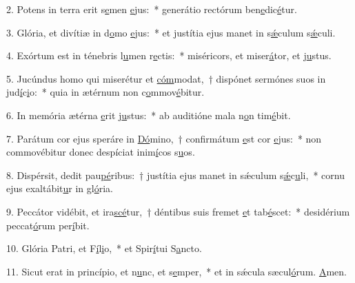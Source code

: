 2. Potens in terra erit s\uline{e}men \uline{e}jus:~* generátio rectórum ben\uline{e}dic\uline{é}tur.\par 
3. Glória, et divítiæ in d\uline{o}mo \uline{e}jus:~* et justítia ejus manet in s\uline{ǽ}culum s\uline{ǽ}culi.\par 
4. Exórtum est in ténebris l\uline{u}men r\uline{e}ctis:~* miséricors, et miser\uline{á}tor, et j\uline{u}stus.\par 
5. Jucúndus homo qui miserétur et \uline{cóm}modat,~† dispónet sermónes suos in jud\uline{í}c\uline{i}o:~* quia in ætérnum non c\uline{o}mmov\uline{é}bitur.\par 
6. In memória ætérna \uline{e}rit j\uline{u}stus:~* ab auditióne mala n\uline{o}n tim\uline{é}bit.\par 
7. Parátum cor ejus speráre in \uline{Dó}mino,~† confirmátum \uline{e}st cor \uline{e}jus:~* non commovébitur donec despíciat inim\uline{í}cos s\uline{u}os.\par 
8. Dispérsit, dedit pau\uline{pé}ribus:~† justítia ejus manet in sǽculum s\uline{ǽ}c\uline{u}li,~* cornu ejus exaltábit\uline{u}r in gl\uline{ó}ria.\par 
9. Peccátor vidébit, et ira\uline{scé}tur,~† déntibus suis fremet \uline{e}t tab\uline{é}scet:~* desidérium peccat\uline{ó}rum per\uline{í}bit.\par 
10. Glória Patri, et F\uline{í}l\uline{i}o,~* et Spir\uline{í}tui S\uline{a}ncto.\par 
11. Sicut erat in princípio, et n\uline{u}nc, et s\uline{e}mper,~* et in sǽcula sæcul\uline{ó}rum. \uline{A}men.\par 
